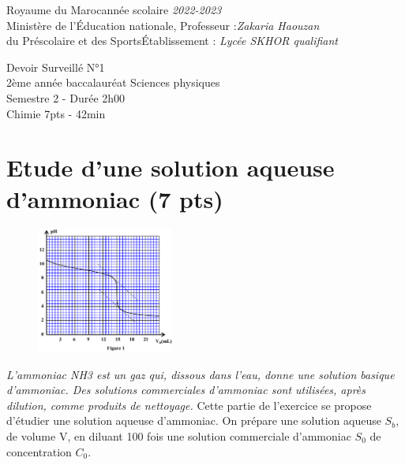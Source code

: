 \documentclass[12pt]{article}
\newcommand\headerMe[2]{\noindent{}#1\hfill#2}
\begin{document}
\headerMe{Royaume du Maroc}{année scolaire \emph{2022-2023}}\\
\headerMe{Ministère de l'Éducation nationale, }{  Professeur :\emph{Zakaria Haouzan}}\\
\headerMe{du Préscolaire et des Sports}{Établissement : \emph{Lycée SKHOR qualifiant}}\\
\vspace{-1cm}
\begin{center}
Devoir Surveillé  N°1 \\
    2ème année baccalauréat Sciences physiques\\
Semestre 2 - Durée 2h00
\\
    \vspace{.2cm}
\hrulefill
\Large{Chimie 7pts - 42min}
\hrulefill\\

\end{center}
 \section*{Etude d’une solution aqueuse d’ammoniac \dotfill(7 pts) }
\begin{figure}
\vspace{-1.2cm}
\begin{center}
\includegraphics[width=0.4\textwidth]{./chimie00.png}
\end{center}
\end{figure}
\textit{L'ammoniac NH3 est un gaz qui, dissous dans l’eau, donne une solution basique d'ammoniac. Des
solutions commerciales d'ammoniac sont utilisées, après dilution, comme produits de nettoyage.}
Cette partie de l’exercice se propose d’étudier une solution aqueuse d’ammoniac.
On prépare une solution aqueuse $S_b$, de volume V, en diluant 100 fois une solution commerciale
d’ammoniac $S_0$ de concentration $C_0$.
\end{document}
